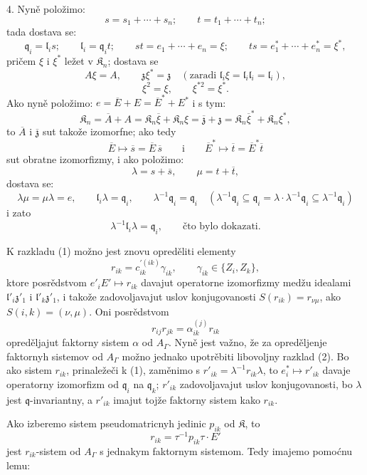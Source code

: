 \documentclass[11pt]{article}
\begin{document}
4. Nyně položimo:
\[
s=s_1+\cdots+s_n;\qquad t=t_1+\cdots+t_n;
\]
tada dostava se:
\[
\mathfrak q_i=\mathfrak l_is;\qquad
\mathfrak l_i=\mathfrak q_it;\qquad
st=e_1+\cdots+e_n=\xi;\qquad
ts=e_1^*+\cdots+e_n^*=\xi^*,
\]
pričem \(\xi\) i \(\xi^*\) ležet v \(\mathfrak K_n\); dostava se
\[
A\xi=A,\qquad \mathfrak z\xi^*=\mathfrak z\quad
(\text{zaradi }\mathfrak l_i\xi=\mathfrak l_i\mathfrak l_i=\mathfrak l_i),
\]
\[
\xi^2=\xi,\qquad \xi^{*2}=\xi^*.
\]
Ako nyně položimo: \(e=\overline E+E=\overline E^*+E^*\) i s tym:
\[
\mathfrak K_n=\overline A+A
=\mathfrak K_n\overline\xi+\mathfrak K_n\xi
=\overline{\mathfrak z}+\mathfrak z
=\mathfrak K_n\overline\xi^*+\mathfrak K_n\xi^*,
\]
to \(\overline A\) i \(\overline{\mathfrak z}\) sut takože izomorfne; ako tedy
\[
\overline E\mapsto\overline s=\overline E\,\overline s
\qquad\text{i}\qquad
\overline E^*\mapsto\overline t=\overline E^*\overline t
\]
sut obratne izomorfizmy, i ako položimo:
\[
\lambda=s+\overline s,\qquad \mu=t+\overline t,
\]
dostava se:
\[
\lambda\mu=\mu\lambda=e,\qquad
\mathfrak l_i\lambda=\mathfrak q_i,\qquad
\lambda^{-1}\mathfrak q_i=\mathfrak q_i
\quad
(\lambda^{-1}\mathfrak q_i\subseteq\mathfrak q_i
=\lambda\cdot\lambda^{-1}\mathfrak q_i\subseteq\lambda^{-1}\mathfrak q_i)
\]
i zato
\[
\lambda^{-1}\mathfrak l_i\lambda=\mathfrak q_i,\qquad \text{čto bylo dokazati.}
\]

K razkladu (1) možno jest znovu opreděliti elementy
\[
r_{ik}=c_{ik}^{\prime(ik)}\gamma_{ik},\qquad \gamma_{ik}\in\{Z_i,Z_k\},
\]
ktore posrědstvom \(e'_iE'\mapsto r_{ik}\) davajut operatorne izomorfizmy medžu idealami \(\mathfrak l'_i\mathfrak z'_1\) i \(\mathfrak l'_k\mathfrak z'_1\), i takože zadovoljavajut uslov konjugovanosti \(S(r_{ik})=r_{\nu\mu}\), ako \(S(i,k)=(\nu,\mu)\). Oni posrědstvom
\[
r_{ij}r_{jk}=\alpha_{ik}^{(j)}r_{ik}
\]
opreděljajut faktorny sistem \(\alpha\) od \(A_\Gamma\). Nyně jest važno, že za opreděljenje faktornyh sistemov od \(A_\Gamma\) možno jednako upotrěbiti libovoljny razklad (2). Bo ako sistem \(r_{ik}\), prinaležeči k (1), zaměnimo s \(r'_{ik}=\lambda^{-1}r_{ik}\lambda\), to \(e_i^*\mapsto r'_{ik}\) davaje operatorny izomorfizm od \(\mathfrak q_i\) na \(\mathfrak q_k\); \(r'_{ik}\) zadovoljavajut uslov konjugovanosti, bo \(\lambda\) jest \(\mathfrak q\)-invariantny, a \(r'_{ik}\) imajut tojže faktorny sistem kako \(r_{ik}\).

Ako izberemo sistem pseudomatricnyh jedinic \(p_{ik}\) od \(\mathfrak K\), to
\[
r_{ik}=\tau^{-1}p_{ik}\tau\cdot E'
\]
jest \(r_{ik}\)-sistem od \(A_\Gamma\) s jednakym faktornym sistemom. Tedy imajemo pomoćnu lemu:
\end{document}
